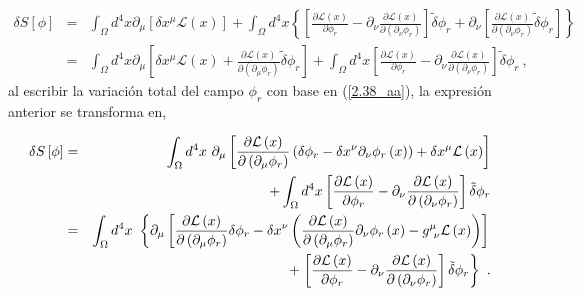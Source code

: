 \begin{eqnarray*}
\delta S\left[ \phi \right]  &=&\int_{\Omega }d^{4}x\partial _{\mu }\left[\delta x^{\mu }\mathcal{L}\left( x\right) \right] +\int_{\Omega}d^{4}x\left\{ \left[ \frac{\partial \mathcal{L}\left( x\right) }{\partial \phi _{r}}-\partial _{\nu }\frac{\partial \mathcal{L}\left( x\right) }{\partial \left( \partial _{\nu }\phi _{r}\right) }\right] \tilde{\delta}\phi
_{r}+\partial _{\nu }\left[ \frac{\partial \mathcal{L}\left( x\right) }{\partial \left( \partial _{\nu }\phi _{r}\right) }\tilde{\delta}\phi _{r}\right] \right\}  \\
&=&\int_{\Omega }d^{4}x\partial _{\mu }\left[ \delta x^{\mu }\mathcal{L}\left( x\right) +\frac{\partial \mathcal{L}\left( x\right) }{\partial \left(\partial _{\mu }\phi _{r}\right) }\tilde{\delta}\phi _{r}\right] +\int_{\Omega}d^{4}x \left[ \frac{\partial \mathcal{L}\left( x\right) }{\partial \phi _{r}}-\partial _{\nu }\frac{\partial \mathcal{L}\left( x\right) }{\partial \left( \partial _{\nu }\phi _{r}\right) }\right] \tilde{\delta}\phi_{r} ~,
\end{eqnarray*}
al escribir la variación total del campo $\phi_{r}$ con base en (\ref{2.38_aa}), la expresión anterior se transforma en,

\begin{eqnarray}
\delta S\left[ \phi \right]  &=&\int_{\Omega }d^{4}x~\partial _{\mu }\left[ \frac{\partial \mathcal{L}\left( x\right) }{\partial \left( \partial _{\mu}\phi _{r}\right) }\left( \delta \phi _{r}-\delta x^{\nu }\partial _{\nu
}\phi _{r}\left( x\right) \right) +\delta x^{\mu }\mathcal{L}\left( x\right) \right]   \notag \\
&&+\int_{\Omega }d^{4}x\left[ \frac{\partial \mathcal{L}\left( x\right) }{\partial \phi _{r}}-\partial _{\nu }\frac{\partial \mathcal{L}\left(x\right) }{\partial \left( \partial _{\nu }\phi _{r}\right) }\right] \tilde{\delta}\phi _{r}  \notag \\
&=&\int_{\Omega }d^{4}x~\left\{ \partial _{\mu }\left[ \frac{\partial \mathcal{L}\left( x\right) }{\partial \left( \partial _{\mu }\phi_{r}\right) }\delta \phi _{r}-\delta x^{\nu }\left( \frac{\partial \mathcal{L%
}\left( x\right) }{\partial \left( \partial _{\mu }\phi _{r}\right) }\partial _{\nu }\phi _{r}\left( x\right) -g_{~\nu }^{\mu }\mathcal{L}\left(x\right) \right) \right] \right.   \notag \\
&&+\left. \left[ \frac{\partial \mathcal{L}\left( x\right) }{\partial \phi_{r}}-\partial _{\nu }\frac{\partial \mathcal{L}\left( x\right) }{\partial\left( \partial _{\nu }\phi _{r}\right) }\right] \tilde{\delta}\phi_{r}\right\} ~.
\end{eqnarray}

